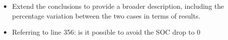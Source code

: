 \documentclass[11pt,a4paper,final]{article}
\begin{document}
\begin{itemize}
\item Extend the conclusions to provide a broader description, including the percentage variation between the two cases in terms of results.
\end{itemize}

\begin{quote}
  \textcolor{blue}{}
\end{quote}

\begin{itemize}
\item Referring to line 356: is it possible to avoid the SOC drop to 0%
\end{itemize}

\begin{quote}
  \textcolor{blue}{}
\end{quote}
\end{document}
